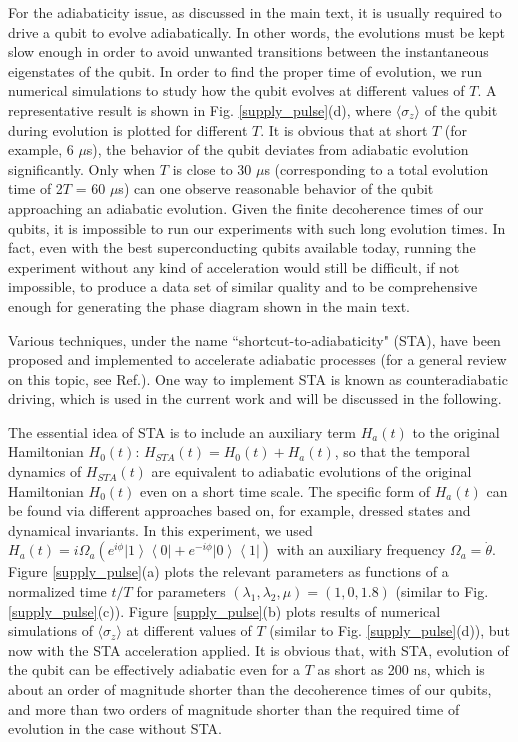 \documentclass[aps,reprint,groupedaddress,showpacs,superscriptaddress]{revtex4-1}
\newcommand{\ket}[1]{\left| #1 \right>} %
\newcommand{\bra}[1]{\left< #1 \right|} %
\begin{document}
For the adiabaticity issue, as discussed in the main text, it is usually required to drive a qubit to evolve adiabatically. In other words, the evolutions must be kept slow enough in order to avoid unwanted transitions between the instantaneous eigenstates of the qubit. In order to find the proper time of evolution, we run numerical simulations to study how the qubit evolves at different values of $T$. A representative result is shown in Fig. \ref{supply_pulse}(d), where $\langle\sigma_{z}\rangle$ of the qubit during evolution is plotted for different $T$. It is obvious that at short $T$ (for example, 6 $\mu$s), the behavior of the qubit deviates from adiabatic evolution significantly. Only when $T$ is close to 30 $\mu$s (corresponding to a total evolution time of 2$T$ = 60 $\mu$s) can one observe reasonable behavior of the qubit approaching an adiabatic evolution. Given the finite decoherence times of our qubits, it is impossible to run our experiments with such long evolution times. In fact, even with the best superconducting qubits available today, running the experiment without any kind of acceleration would still be difficult, if not impossible, to produce a data set of similar quality and to be comprehensive enough for generating the phase diagram shown in the main text.     

Various techniques, under the name ``shortcut-to-adiabaticity" (STA), have been proposed and implemented to accelerate adiabatic processes (for a general review on this topic, see Ref.\cite{Torrontegui2013}). One way to implement STA is known as counteradiabatic driving\cite{Chen2010}, which is used in the current work and will be discussed in the following. 

The essential idea of STA is to include an auxiliary term $H_a(t)$ to the original Hamiltonian $H_0(t)$: $H_{STA}(t) = H_0(t) + H_a(t)$, so that the temporal dynamics of $H_{STA}(t)$ are equivalent to adiabatic evolutions of the original Hamiltonian $H_0(t)$ even on a short time scale. The specific form of $H_a(t)$ can be found via different approaches based on, for example, dressed states and dynamical invariants. In this experiment, we used $H_a(t) = i  \Omega_a (e^{i\phi} \ket{1}\bra{0} +e^{-i\phi} \ket{0}\bra{1})$ with an auxiliary frequency $\Omega_a = \dot{\theta}$. Figure \ref{supply_pulse}(a) plots the relevant parameters as functions of a normalized time $t/T$ for parameters $(\lambda_{1},\lambda_{2},\mu) = (1,0,1.8)$ (similar to Fig. \ref{supply_pulse}(c)). Figure \ref{supply_pulse}(b) plots results of numerical simulations of $\langle\sigma_{z}\rangle$ at different values of $T$ (similar to Fig. \ref{supply_pulse}(d)), but now with the STA acceleration applied. It is obvious that, with STA, evolution of the qubit can be effectively adiabatic even for a $T$ as short as 200 ns, which is about an order of magnitude shorter than the decoherence times of our qubits, and more than two orders of magnitude shorter than the required time of evolution in the case without STA. 
\end{document}
